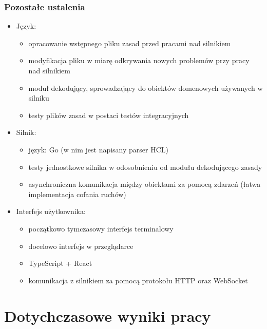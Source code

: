 \documentclass{beamer}
\begin{document}
\begin{frame}[allowframebreaks]
	\frametitle{Pozostałe ustalenia}
	\begin{itemize}
		\item Język:
		      \begin{itemize}
			      \item opracowanie wstępnego pliku zasad przed pracami nad silnikiem
			      \item modyfikacja pliku w miarę odkrywania nowych problemów przy pracy nad silnikiem
			      \item moduł dekodujący, sprowadzający do obiektów domenowych używanych w silniku
			      \item testy plików zasad w postaci testów integracyjnych
		      \end{itemize}
		\item Silnik:
		      \begin{itemize}
			      \item język: Go (w nim jest napisany parser HCL)
			      \item testy jednostkowe silnika w odosobnieniu od modułu dekodującego zasady
			      \item asynchroniczna komunikacja między obiektami za pomocą zdarzeń (łatwa implementacja cofania ruchów)
		      \end{itemize}
		      \framebreak
		\item Interfejs użytkownika:
		      \begin{itemize}
			      \item początkowo tymczasowy interfejs terminalowy
			      \item docelowo interfejs w przeglądarce
			      \item TypeScript + React
			      \item komunikacja z silnikiem za pomocą protokołu HTTP oraz WebSocket
		      \end{itemize}
	\end{itemize}
\end{frame}

\section{Dotychczasowe wyniki pracy}
\end{document}
